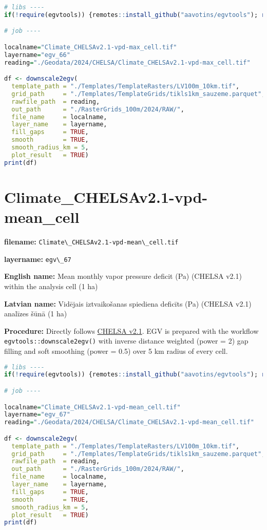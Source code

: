\documentclass[
]{book}
\newcommand{\passthrough}[1]{#1}
\begin{document}
\begin{lstlisting}[language=R]
# libs ----
if(!require(egvtools)) {remotes::install_github("aavotins/egvtools"); require(egvtools)}

# job ----

localname="Climate_CHELSAv2.1-vpd-max_cell.tif"
layername="egv_66"
reading="./Geodata/2024/CHELSA/Climate_CHELSAv2.1-vpd-max_cell.tif"

df <- downscale2egv(
  template_path = "./Templates/TemplateRasters/LV100m_10km.tif",
  grid_path     = "./Templates/TemplateGrids/tikls1km_sauzeme.parquet",
  rawfile_path  = reading,
  out_path      = "./RasterGrids_100m/2024/RAW/",
  file_name     = localname,
  layer_name    = layername,
  fill_gaps     = TRUE,
  smooth        = TRUE,
  smooth_radius_km = 5,
  plot_result   = TRUE)
print(df)
\end{lstlisting}

\section{Climate\_CHELSAv2.1-vpd-mean\_cell}\label{ch06.067}

\textbf{filename:} \passthrough{\lstinline!Climate\_CHELSAv2.1-vpd-mean\_cell.tif!}

\textbf{layername:} \passthrough{\lstinline!egv\_67!}

\textbf{English name:} Mean monthly vapor pressure deficit (Pa) (CHELSA v2.1) within the analysis cell (1 ha)

\textbf{Latvian name:} Vidējais iztvaikošanas spiediena deficīts (Pa) (CHELSA v2.1) analīzes šūnā (1 ha)

\textbf{Procedure:} Directly follows \hyperref[Ch04.11]{CHELSA v2.1}. EGV is prepared with the
workflow \passthrough{\lstinline!egvtools::downscale2egv()!} with inverse distance weighted (power = 2)
gap filling and soft smoothing (power = 0.5) over 5 km radius of every cell.

\begin{lstlisting}[language=R]
# libs ----
if(!require(egvtools)) {remotes::install_github("aavotins/egvtools"); require(egvtools)}

# job ----

localname="Climate_CHELSAv2.1-vpd-mean_cell.tif"
layername="egv_67"
reading="./Geodata/2024/CHELSA/Climate_CHELSAv2.1-vpd-mean_cell.tif"

df <- downscale2egv(
  template_path = "./Templates/TemplateRasters/LV100m_10km.tif",
  grid_path     = "./Templates/TemplateGrids/tikls1km_sauzeme.parquet",
  rawfile_path  = reading,
  out_path      = "./RasterGrids_100m/2024/RAW/",
  file_name     = localname,
  layer_name    = layername,
  fill_gaps     = TRUE,
  smooth        = TRUE,
  smooth_radius_km = 5,
  plot_result   = TRUE)
print(df)
\end{lstlisting}
\end{document}
